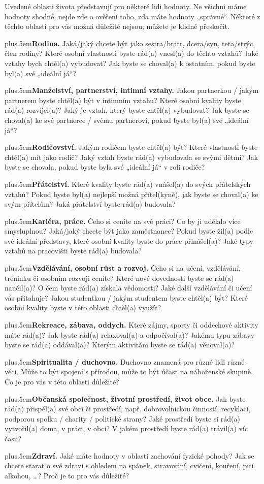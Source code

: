 		Uvedené oblasti života představují pro některé lidi hodnoty. Ne všichni máme hodnoty shodné, nejde zde o ověření toho, zda máte hodnoty „správné“. Některé z těchto oblastí pro vás možná důležité nejsou; můžete je klidně přeskočit.
		\bgroup
		\parskip0pt
		\def\valItem#1{\par\vskip0pt plus.5em\textbf{#1} }
			\valItem{Rodina.}  Jaká/jaký chcete být jako sestra/bratr, dcera/syn, teta/\allowbreak{}strýc, člen rodiny? Které osobní vlastnosti byste rád(a) vnesl(a) do těchto vztahů? Jaké vztahy bych chtěl(a) vybudovat? Jak byste se choval(a) k ostatním, pokud byste byl(a) své „ideální já“?
			\valItem{Manželství, partnerství, intimní vztahy.}  Jakou partnerkou / jakým partnerem byste chtěl(a) být v intimním vztahu? Které osobní kvality byste rád(a) rozvíjel(a)? Jaký je vztah, který byste chtěl(a) vybudovat? Jak byste se choval(a) ke své partnerce / svému partnerovi, pokud byste byl(a) své „ideální já“?
			\valItem{Rodičovství.}  Jakým rodičem byste chtěl(a) být? Které vlastnosti byste chtěl(a) mít jako rodič? Jaký vztah byste rád(a) vybudovala se svými dětmi? Jak byste se chovala, pokud byste byla své „ideální já“ v roli rodiče?
			\valItem{Přátelství.} Které kvality byste rád(a) vnášel(a) do svých přátelských vztahů? Pokud byste byl(a) nejlepší možná přítel(kyně), jak byste se choval(a) ke svým přítelům? Jaká přátelství byste rád(a) budovala?
			\valItem{Kariéra, práce.} Čeho si ceníte na své práci? Co by ji udělalo více smysluplnou? Jaká/jaký chcete být jako zaměstnanec?  Pokud byste žil(a) podle své ideální představy, které osobní kvality byste do práce přinášel(a)? Jaké typy vztahů na pracovišti byste rád(a) budovala?
			\valItem{Vzdělávání, osobní růst a rozvoj.}  Čeho si na učení, vzdělávání, tréninku či osobním rozvoji ceníte? Které nové dovednosti byste se rád(a) naučil(a)? O čem byste rád(a) získala vědomosti? Jaké další vzdělávání či učení vás přitahuje? Jakou studentkou / jakým studentem byste chtěl(a) být? Které osobní kvality byste v této oblasti chtěl(a) využít?
			\valItem{Rekreace, zábava, oddych.}  Které zájmy, sporty či oddechové aktivity máte rád(a)? Jak byste rád(a) relaxoval(a) a odpočíval(a)? Jakému typu zábavy byste se rád(a) oddával(a)? Kterým aktivitám byste se rád(a) věnoval(a)?
			\valItem{Spiritualita / duchovno.}  Duchovno znamená pro různé lidi různé věci. Může to být spojení s přírodou, může to být účast na náboženské skupině. Co je pro vás v této oblasti důležité?
			\valItem{Občanská společnost, životní prostředí, život obce.}  Jak byste rád(a) přispěl(a) své obci či prostředí, např. dobrovolnickou činností, recyklací, podporou spolku / charity / politické strany? Jaké prostředí byste si rád(a) vytvořil(a) doma, v práci, v obci? V jakém prostředí byste rád(a) trávil(a) víc času?
			\valItem{Zdraví.}  Jaké máte hodnoty v oblasti zachování fyzické pohody? Jak se chcete starat o své zdraví s ohledem na spánek, stravování, cvičení, kouření, pití alkohou, …? Proč je to pro vás důležité?
		\egroup


